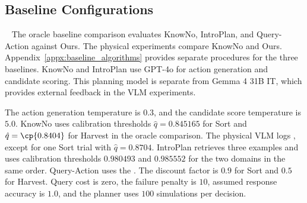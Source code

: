 
\subsection{Baseline Configurations}~\label{appx:baseline_configs}
The oracle baseline comparison evaluates KnowNo, IntroPlan, and Query-Action against Ours. The physical experiments compare KnowNo and Ours. Appendix~\ref{appx:baseline_algorithms} provides separate procedures for the three baselines. KnowNo and IntroPlan use GPT-4o for action generation and candidate scoring. This planning model is separate from Gemma 4 31B IT, which provides external feedback in the VLM experiments.

The  action generation temperature is $0.3$, and the candidate score temperature is $5.0$. KnowNo uses calibration thresholds $\hat{q}=0.845165$ for Sort and $\hat{q}=\cp{0.8404}$ for Harvest in the oracle comparison. The physical VLM logs , except for one Sort trial with $\hat{q}=0.8704$.  IntroPlan retrieves three examples and uses calibration thresholds $0.980493$ and $0.985552$ for the two domains in the same order. Query-Action uses the . The discount factor is $0.9$ for Sort and $0.5$ for Harvest. Query cost is zero, the failure penalty is $10$, assumed response accuracy is $1.0$, and the planner uses $100$ simulations per decision.


